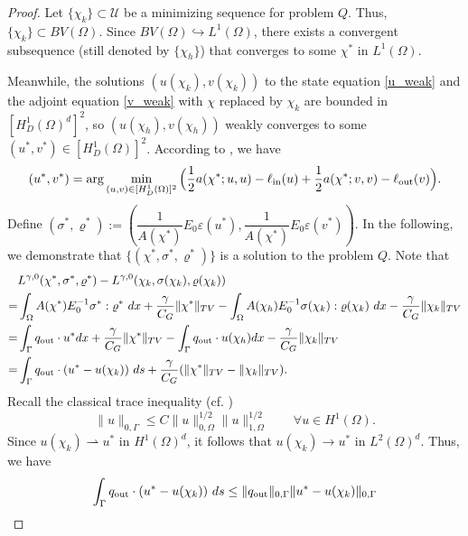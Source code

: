 \documentclass{amsart}
\begin{document}
\begin{proof}
    Let \(\{\chi_k\}\subset \mathcal{U}\) be a minimizing sequence for problem \( Q \). Thus, \(\{\chi_k\} \subset BV(\Omega)\). Since \( BV(\Omega) \hookrightarrow L^1(\Omega) \), there exists a convergent subsequence (still denoted by \(\{\chi_h\}\)) that converges to some \(\chi^*\) in \( L^1(\Omega) \). 
    
    Meanwhile, the solutions \((u(\chi_k), v(\chi_k))\) to the state equation \eqref{u_weak} and the adjoint equation \eqref{v_weak} with $\chi$ replaced by $\chi_k$  are bounded in \([H_D^1(\Omega)^d]^2\), so \((u(\chi_h), v(\chi_h))\) weakly converges to some \((u^*, v^*) \in [H_D^1(\Omega)]^2\). According to \cite{Ambr}, we have 
    $$(u^*, v^*) = \arg\min_{(u, v) \in [H_D^1(\Omega)]^2} \Big( \dfrac{1}{2}a(\chi^*;u,u)-\ell_{\rm in}(u)+\dfrac{1}{2}a(\chi^*;v,v)-\ell_{\rm out}(v)\Big).$$
    Define $(\sigma^*,\varrho^*):=(\dfrac{1}{A(\chi^*)}{E}_0\varepsilon(u^*),\dfrac{1}{A(\chi^*)}{E}_0\varepsilon(v^*))$. In the following, we demonstrate that \(\{(\chi^*, \sigma^*, \varrho^*)\}\) is a solution to the problem \( Q \). Note that
    \begin{align*}
        &L^{\gamma,0}(\chi^*,\sigma^*,\varrho^*)-L^{\gamma,0}(\chi_k,\sigma(\chi_k),\varrho(\chi_k))\\
        =&\int_\Omega A(\chi^*)E^{-1}_0\sigma^*:\varrho^*\ dx+\dfrac{\gamma}{C_G} \|\chi^*\|_{TV}-\int_\Omega A(\chi_h)E^{-1}_0\sigma(\chi_k):\varrho(\chi_k)\ dx-\dfrac{\gamma}{C_G} \|\chi_k\|_{TV}\\
        =&\int_\Gamma q_{\rm out}\cdot u^* dx + \dfrac{\gamma}{C_G} \|\chi^*\|_{TV}-\int_\Gamma q_{\rm out}\cdot u(\chi_h) dx-\dfrac{\gamma}{C_G} \|\chi_k\|_{TV}\\
        =&\int_\Gamma q_{\rm out}\cdot (u^*-u(\chi_k))\ ds + \dfrac{\gamma}{C_G}(\|\chi^*\|_{TV}-\|\chi_k\|_{TV}).
    \end{align*}
   Recall the classical trace inequality (cf. \cite{BrennerScott2008})
    \begin{equation}
        \|u\|_{0,\Gamma}\leq C\|u\|_{0,\Omega}^{1/2}\|u\|_{1,\Omega}^{1/2}\qquad \forall u\in H^1(\Omega).
    \end{equation}
    Since \( u(\chi_k) \rightharpoonup u^*\) in $H^1(\Omega)^d$, it follows that \(u(\chi_k) \rightarrow u^*\) in $L^2(\Omega)^d$. Thus, we have
    \begin{align*}
        \int_\Gamma q_{\rm out}\cdot (u^*-u(\chi_k))\ ds&\leq \|q_{\rm out}\|_{0,\Gamma}\|u^*-u(\chi_k)\|_{0,\Gamma}\\

\end{align*}
\end{proof}
\end{document}
